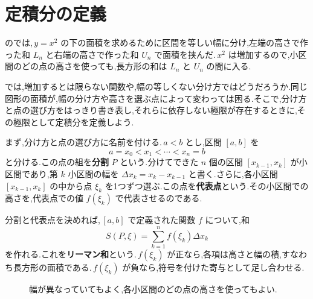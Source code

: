 \section{定積分の定義}\label{節:リーマン和}
のでは,\,$y=x^2$ の下の面積を求めるために区間を等しい幅に分け,左端の高さで作った和 $L_n$ と右端の高さで作った和 $U_n$ で面積を挟んだ.\,$x^2$ は増加するので,小区間のどの点の高さを使っても,長方形の和は $L_n$ と $U_n$ の間に入る.

では,増加するとは限らない関数や,幅の等しくない分け方ではどうだろうか.同じ図形の面積が,幅の分け方や高さを選ぶ点によって変わっては困る.そこで,分け方と点の選び方をはっきり書き表し,それらに依存しない極限が存在するときに,その極限として定積分を定義しよう.

まず,分け方と点の選び方に名前を付ける.\,$a<b$ とし,区間 $[a,b]$ を
\[
 a=x_0<x_1<\cdots<x_n=b
\]
と分ける.この点の組を\textbf{分割} $P$ という.分けてできた $n$ 個の区間 $[x_{k-1},x_k]$ が小区間であり,第 $k$ 小区間の幅を $\Delta x_k=x_k-x_{k-1}$ と書く.さらに,各小区間 $[x_{k-1},x_k]$ の中から点 $\xi_k$ を1つずつ選ぶ.この点を\textbf{代表点}という.その小区間での高さを,代表点での値 $f(\xi_k)$ で代表させるのである.

分割と代表点を決めれば,\,$[a,b]$ で定義された関数 $f$ について,和
\[
 S(P,\xi)=\sum_{k=1}^{n}f(\xi_k)\Delta x_k
\]
を作れる.これを\textbf{リーマン和}という.\,$f(\xi_k)$ が正なら,各項は高さと幅の積,すなわち長方形の面積である.\,$f(\xi_k)$ が負なら,符号を付けた寄与として足し合わせる.

\begin{figure}[htbp]
\centering
{}
\caption{幅が異なっていてもよく,各小区間のどの点の高さを使ってもよい.}
\label{図:リーマン和}
\end{figure}


